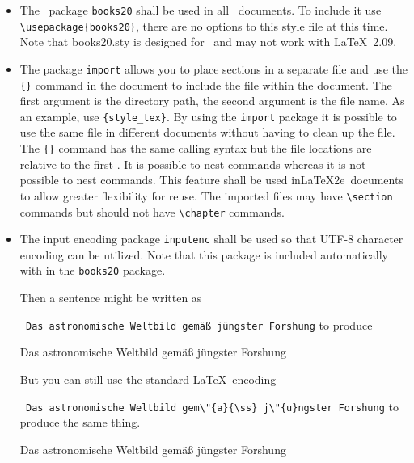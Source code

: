 \begin{itemize}
  
\item The \LaTeXe\ package \texttt{books20} shall be used in all
  \LaTeXe\ documents. To include it use \verb|\usepackage{books20}|, there
  are no options to this style file at this time. Note that books20.sty
  is designed for \LaTeXe\ and may not work with \LaTeX\ 2.09.
  

\item The package \texttt{import} allows you to place sections in a
  separate file and use the \verb|{}| command in the document
  to include the file within the document. The first argument is the
  directory path, the second argument is the file name. As an example,
  use \verb|{style_tex}|.  By using the \texttt{import}
  package it is possible to use the same file in different documents
  without having to clean up the file. The \verb|{}|
  command has the same calling syntax but the file locations are
  relative to the first \verb||. It is possible to nest
  \verb|| commands whereas it is not possible to nest
  \verb|| commands. This feature shall be used inLaTeX2e\
  documents to allow greater flexibility for reuse. The imported
  files may have \verb|\section| commands but should not have
  \verb|\chapter| commands.

\item {The input encoding package \texttt{inputenc} shall be used
  so that UTF-8 character encoding can be utilized. Note that this
  package is included automatically with in the \texttt{books20} package.

  Then a sentence might be written as
  
  \verb| Das astronomische Weltbild gemäß jüngster Forshung|
  to produce

  Das astronomische Weltbild gemäß jüngster Forshung

  But you can still use the standard \LaTeX\ encoding
  
  \verb| Das astronomische Weltbild gem\"{a}{\ss} j\"{u}ngster Forshung|
  to produce the same thing.

  Das astronomische Weltbild gem\"{a}{\ss} j\"{u}ngster Forshung

}
\end{itemize}

